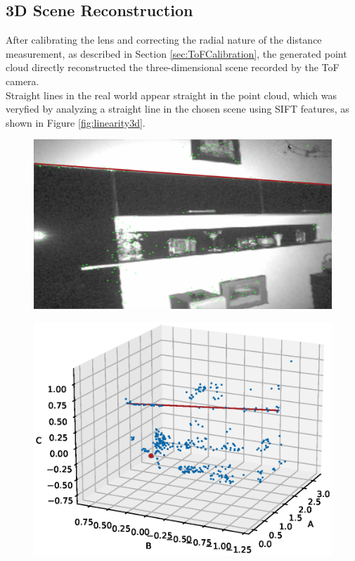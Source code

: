 \subsection{3D Scene Reconstruction}
After calibrating the lens and correcting the radial nature of the distance measurement, as described in Section \ref{sec:ToFCalibration}, the generated point cloud directly reconstructed the three-dimensional scene recorded by the ToF camera.\\
Straight lines in the real world appear straight in the point cloud, which was veryfied by analyzing a straight line in the chosen scene using SIFT features, as shown in Figure \ref{fig:linearity3d}.
\begin{figure}[H]
    \centering
    \begin{minipage}[b]{0.47\textwidth}
      \includegraphics[scale=0.11]{images/cloud_3d_linearity_image.png}
      \label{fig:linearity3d_image} 
    \end{minipage} %
    \begin{minipage}[b]{0.47\textwidth}
      \includegraphics[scale=0.72, trim={3.3cm 3cm 3cm 3.5cm},clip]{images/linearity_3d.eps} 

\end{minipage}
\end{figure}
